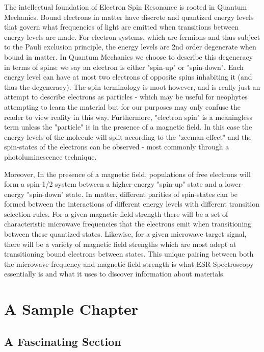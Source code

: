 \documentclass[oneside, astronomy, noacknowlegments]{BYUPhys}
\begin{document}
The intellectual foundation of Electron Spin Resonance is rooted in Quantum Mechanics. Bound electrons in matter have discrete and quantized energy levels that govern what frequencies of light are emitted when transitions between energy levels are made. For electron systems, which are fermions and thus subject to the Pauli exclusion principle, the energy levels are 2nd order degenerate when bound in matter. In Quantum Mechanics we choose to describe this degeneracy in terms of spins: we say an electron is either "spin-up" or "spin-down". Each energy level can have at most two electrons of opposite spins inhabiting it (and thus the degeneracy). The spin terminology is moot however, and is really just an attempt to describe electrons as particles - which may be useful for neophytes attempting to learn the material but for our purposes may only confuse the reader to view reality in this way. Furthermore, "electron spin" is a meaningless term unless the "particle" is in the presence of a magnetic field. In this case the energy levels of the molecule will split according to the "zeeman effect" and the spin-states of the electrons can be observed - most commonly through a photoluminescence technique.

Moreover, In the presence of a magnetic field, populations of free electrons will form a spin-1/2 system between a higher-energy "spin-up" state and a lower-energy "spin-down" state. In matter, different parities of spin-states can be formed between the interactions of different energy levels with different transition selection-rules. For a given magnetic-field strength there will be a set of characteristic microwave frequencies that the electrons emit when transitioning between these quantized states. Likewise, for a given microwave target signal, there will be a variety of magnetic field strengths which are most adept at transitioning bound electrons between states. This unique pairing between both the microwave frequency and magnetic field strength is what ESR Spectroscopy essentially is and what it uses to discover information about materials.







\chapter{A Sample Chapter}

\section{A Fascinating Section}
\label{sec:meaningfulname}
\end{document}
